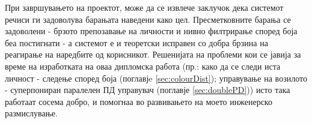 \documentclass[11pt]{article}
\begin{document}
  При завршувањето на проектот, може да се извлече заклучок дека системот речиси ги задоволува барањата наведени како цел. Пресметковните барања се задоволени - брзото препозавање на личности и нивно филтрирање според боја беа постигнати - а системот е и теоретски исправен со добра брзина на реагирање на наредбите од корисникот. Решенијата на проблеми кои се јавија за време на изработката на оваа дипломска работа (пр.: како да се следи иста личност - следење според боја (поглавјe \ref{sec:colourDist}); управување на возилото - суперпониран паралелен ПД управувач (поглавје \ref{sec:doublePD})) исто така работаат сосема добро, и помогнаа во развивањето на моето инженерско размислување.

\end{document}
